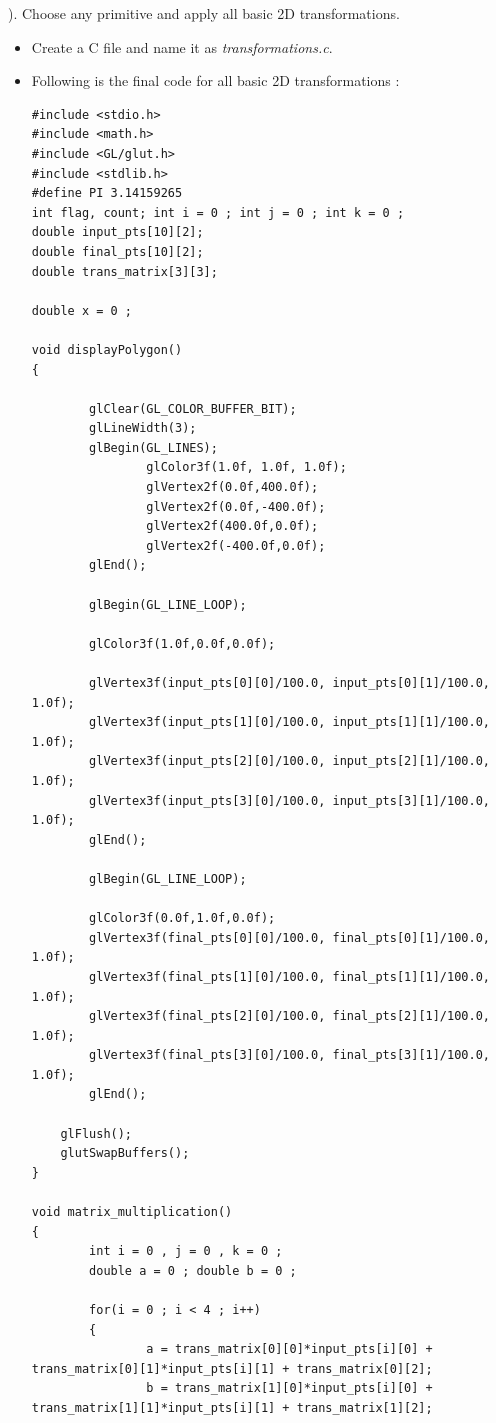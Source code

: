 \vspace{0.5mm} ). Choose any primitive and apply all basic 2D transformations.
\begin{itemize}
\item Create a C file and name it as \textit{transformations.c}.

\item Following is the final code for all basic 2D transformations : 
\begin{lstlisting}
#include <stdio.h>
#include <math.h>
#include <GL/glut.h>
#include <stdlib.h>
#define PI 3.14159265
int flag, count; int i = 0 ; int j = 0 ; int k = 0 ;
double input_pts[10][2];
double final_pts[10][2];
double trans_matrix[3][3];

double x = 0 ;

void displayPolygon()
{

        glClear(GL_COLOR_BUFFER_BIT);
        glLineWidth(3);
        glBegin(GL_LINES);
                glColor3f(1.0f, 1.0f, 1.0f);
                glVertex2f(0.0f,400.0f);
                glVertex2f(0.0f,-400.0f);
                glVertex2f(400.0f,0.0f);
                glVertex2f(-400.0f,0.0f);
        glEnd();

        glBegin(GL_LINE_LOOP);

        glColor3f(1.0f,0.0f,0.0f);

        glVertex3f(input_pts[0][0]/100.0, input_pts[0][1]/100.0, 1.0f);
        glVertex3f(input_pts[1][0]/100.0, input_pts[1][1]/100.0, 1.0f);
        glVertex3f(input_pts[2][0]/100.0, input_pts[2][1]/100.0, 1.0f);
        glVertex3f(input_pts[3][0]/100.0, input_pts[3][1]/100.0, 1.0f);
        glEnd();

        glBegin(GL_LINE_LOOP);

        glColor3f(0.0f,1.0f,0.0f);
        glVertex3f(final_pts[0][0]/100.0, final_pts[0][1]/100.0, 1.0f);
        glVertex3f(final_pts[1][0]/100.0, final_pts[1][1]/100.0, 1.0f);
        glVertex3f(final_pts[2][0]/100.0, final_pts[2][1]/100.0, 1.0f);
        glVertex3f(final_pts[3][0]/100.0, final_pts[3][1]/100.0, 1.0f);
        glEnd();

	glFlush();
	glutSwapBuffers();
}

void matrix_multiplication()
{
        int i = 0 , j = 0 , k = 0 ;
        double a = 0 ; double b = 0 ;

        for(i = 0 ; i < 4 ; i++)
        {
                a = trans_matrix[0][0]*input_pts[i][0] + trans_matrix[0][1]*input_pts[i][1] + trans_matrix[0][2];
                b = trans_matrix[1][0]*input_pts[i][0] + trans_matrix[1][1]*input_pts[i][1] + trans_matrix[1][2];


\end{lstlisting}
\end{itemize}

